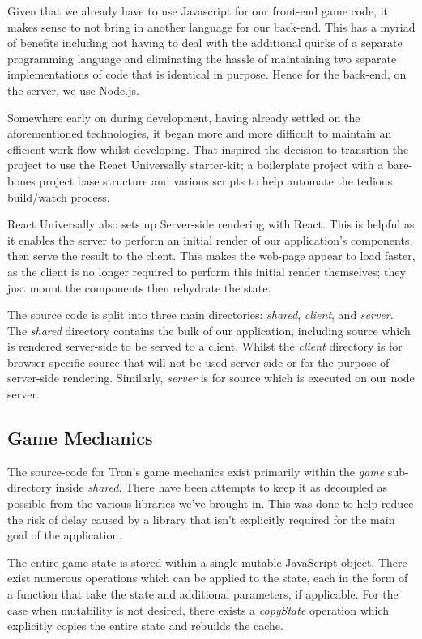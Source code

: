 \documentclass{standalone}
\begin{document}
	Given that we already have to use Javascript for our front-end game code, it makes sense to not bring in another language for our back-end. This has a myriad of benefits including not having to deal with the additional quirks of a separate programming language and eliminating the hassle of maintaining two separate implementations of code that is identical in purpose. Hence for the back-end, on the server, we use Node.js\parencite{NodeJs}.

	Somewhere early on during development, having already settled on the aforementioned technologies, it began more and more difficult to maintain an efficient work-flow whilst developing. That inspired the decision to transition the project to use the React Universally \parencite{ReactUniversally} starter-kit; a boilerplate project with a bare-bones project base structure and various scripts to help automate the tedious build/watch process.

	React Universally also sets up Server-side rendering with React. This is helpful as it enables the server to perform an initial render of our application's components, then serve the result to the client. This makes the web-page appear to load faster, as the client is no longer required to perform this initial render themselves; they just mount the components then rehydrate the state.

	The source code is split into three main directories: \emph{shared}, \emph{client}, and \emph{server}. The \emph{shared} directory contains the bulk of our application, including source which is rendered server-side to be served to a client. Whilst the \emph{client} directory is for browser specific source that will not be used server-side or for the purpose of server-side rendering. Similarly, \emph{server} is for source which is executed on our node server.

	\subsection{Game Mechanics}
		The source-code for Tron's game mechanics exist primarily within the \emph{game} sub-directory inside \emph{shared}. There have been attempts to keep it as decoupled as possible from the various libraries we've brought in. This was done to help reduce the risk of delay caused by a library that isn't explicitly required for the main goal of the application.

		The entire game state is stored within a single mutable JavaScript object. There exist numerous operations which can be applied to the state, each in the form of a function that take the state and additional parameters, if applicable. For the case when mutability is not desired, there exists a \emph{copyState} operation which explicitly copies the entire state and rebuilds the cache.
\end{document}
